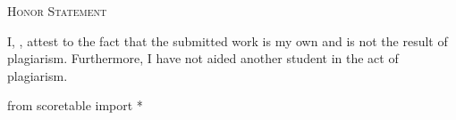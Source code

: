 

\renewcommand\AUTHOR{aoro1@cougars.ccis.edu} %


\topmattertwo



\begin{center}
  \textsc{Honor Statement}
\end{center}
I, ,
attest to the fact that the submitted work is my own and
is not the result of plagiarism.
Furthermore, I have not aided another student in the act of
plagiarism.

\begin{python}
from scoretable import *
\end{python}

\newpage


